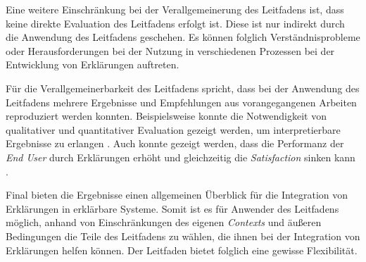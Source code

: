 Eine weitere Einschränkung bei der Verallgemeinerung des Leitfadens ist, dass keine direkte Evaluation des Leitfadens erfolgt ist. Diese ist nur indirekt durch die Anwendung des Leitfadens geschehen. Es können folglich Verständnisprobleme oder Herausforderungen bei der Nutzung in verschiedenen Prozessen bei der Entwicklung von Erklärungen auftreten.

Für die Verallgemeinerbarkeit des Leitfadens spricht, dass bei der Anwendung des Leitfadens mehrere Ergebnisse und Empfehlungen aus vorangegangenen Arbeiten reproduziert werden konnten. Beispielsweise konnte die Notwendigkeit von qualitativer und quantitativer Evaluation gezeigt werden, um interpretierbare Ergebnisse zu erlangen \cite{sokol_explainability_2020}. Auch konnte gezeigt werden, dass die Performanz der \textit{End User} durch Erklärungen erhöht und gleichzeitig die \textit{Satisfaction} sinken kann \cite{koo_understanding_2016}. 

Final bieten die Ergebnisse einen allgemeinen Überblick für die Integration von Erklärungen in erklärbare Systeme. Somit ist es für Anwender des Leitfadens möglich, anhand von Einschränkungen des eigenen \textit{Contexts} und äußeren Bedingungen die Teile des Leitfadens zu wählen, die ihnen bei der Integration von Erklärungen helfen können. Der Leitfaden bietet folglich eine gewisse Flexibilität.

\newpage

